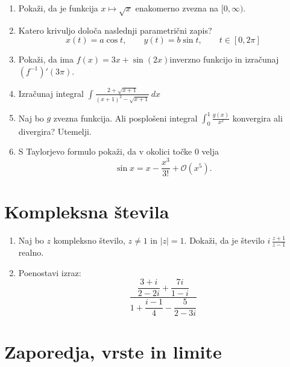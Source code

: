 \documentclass[a4paper,12pt]{article}
\begin{document}
\begin{enumerate}
\item
Pokaži, da je funkcija \(x \mapsto \sqrt{x} \) enakomerno zvezna na \(\lbrack0, \infty)\).

\item
Katero krivuljo določa naslednji parametrični zapis?
\[
x(t) = a \cos t, \qquad %
y(t) = b \sin t, \qquad %
t \in [0, 2 \pi]
\]

\item
Pokaži, da ima \(f(x)= 3x+\sin(2x)\)inverzno funkcijo in izračunaj \((f^{-1})'(3\pi)\).

\item
Izračunaj integral
\(\displaystyle \int\frac{2+\sqrt{x+1}}{(x+1)^2-\sqrt{x+1} }\,dx\)

\item
Naj bo \(g\) zvezna funkcija. Ali posplošeni integral
\(\int_{0}^{1}\frac{g(x)}{x^2}\)
konvergira ali divergira? Utemelji.

\item
S Taylorjevo formulo pokaži, da v okolici točke \(0\) velja
\[\sin x= x- \frac{x^3}{3!}+\mathcal{O}(x^5). \]
\end{enumerate}

\section*{Kompleksna števila}

\begin{enumerate}
\item
Naj bo \(z\) kompleksno število, \(z \ne 1\) in \(|z| = 1\).
Dokaži, da je število \( i \, \frac{z+1}{z-1} \) realno.

\item
Poenostavi izraz:
\[\frac{\dfrac{3+i}{2-2i}+\dfrac{7i}{1-i}}{1+\dfrac{i-1}{4}-\dfrac{5}{2-3i}}\]
\end{enumerate}

\section*{Zaporedja, vrste in limite}
\end{document}
